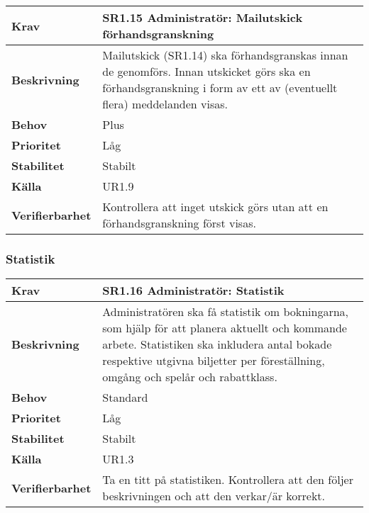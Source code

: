 \documentclass[a4paper, twoside, 11pt, titlepage]{article}
\begin{document}
		\begin{tabular} { p{2.6cm} p{12.5cm} }
			\hline
			\sffamily\textbf{Krav} & \sffamily\textbf{SR1.15 Administratör: Mailutskick förhandsgranskning } \\
			\hline
			\sffamily\textbf{Beskrivning} & Mailutskick (SR1.14) ska förhandsgranskas innan de genomförs. Innan utskicket görs ska en förhandsgranskning i form av ett av (eventuellt flera) meddelanden visas.  \\
			\hline
			\sffamily\textbf{Behov} & Plus  \\
			\hline
			\sffamily\textbf{Prioritet} & Låg  \\
			\hline
			\sffamily\textbf{Stabilitet} & Stabilt  \\
			\hline
			\sffamily\textbf{Källa} & UR1.9  \\
			\hline
			\sffamily\textbf{Verifierbarhet} & Kontrollera att inget utskick görs utan att en förhandsgranskning först visas.  \\
			\hline
		\end{tabular}


		\subsubsection{Statistik}


		\begin{tabular} { p{2.6cm} p{12.5cm} }
			\hline
			\sffamily\textbf{Krav} & \sffamily\textbf{SR1.16 Administratör: Statistik } \\
			\hline
			\sffamily\textbf{Beskrivning} & Administratören ska få statistik om bokningarna, som hjälp för att planera aktuellt och kommande arbete. Statistiken ska inkludera antal bokade respektive utgivna biljetter per föreställning, omgång och spelår och rabattklass.  \\
			\hline
			\sffamily\textbf{Behov} & Standard  \\
			\hline
			\sffamily\textbf{Prioritet} & Låg  \\
			\hline
			\sffamily\textbf{Stabilitet} & Stabilt  \\
			\hline
			\sffamily\textbf{Källa} & UR1.3  \\
			\hline
			\sffamily\textbf{Verifierbarhet} & Ta en titt på statistiken. Kontrollera att den följer beskrivningen och att den verkar/är korrekt.  \\
			\hline
		\end{tabular}
		\vspace{6mm}
\end{document}
